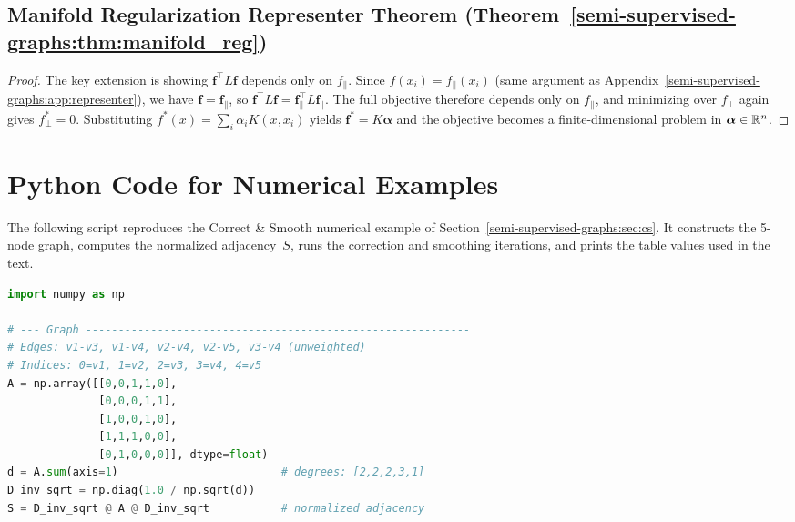 \begin{notechapter}
\subsection{Manifold Regularization Representer Theorem
  (Theorem~\ref{semi-supervised-graphs:thm:manifold_reg})}
\label{semi-supervised-graphs:app:manifold}

\begin{proof}
The key extension is showing $\mathbf{f}^\top L\mathbf{f}$ depends only on
$f_\parallel$. Since $f(x_i) = f_\parallel(x_i)$ (same argument as
Appendix~\ref{semi-supervised-graphs:app:representer}), we have $\mathbf{f} = \mathbf{f}_\parallel$,
so $\mathbf{f}^\top L\mathbf{f} = \mathbf{f}_\parallel^\top L\mathbf{f}_\parallel$.
The full objective therefore depends only on $f_\parallel$, and minimizing over
$f_\perp$ again gives $f_\perp^* = 0$. Substituting
$f^*(x) = \sum_i \alpha_i K(x, x_i)$ yields $\mathbf{f}^* = K\boldsymbol{\alpha}$
and the objective becomes a finite-dimensional problem in
$\boldsymbol{\alpha} \in \mathbb{R}^n$.
\end{proof}


\newpage
\section{Python Code for Numerical Examples}
\label{semi-supervised-graphs:app:code}

The following script reproduces the Correct \& Smooth numerical example of
Section~\ref{semi-supervised-graphs:sec:cs}. It constructs the 5-node graph, computes the normalized
adjacency~$S$, runs the correction and smoothing iterations, and prints the
table values used in the text.


\begin{tcolorbox}[
  title={Listing 1: Correct \& Smooth on the 5-node example (Section~\ref{semi-supervised-graphs:sec:cs})},
  colback=white, colframe=black!70, fonttitle=\small\bfseries,
  breakable, enhanced, left=2mm, right=2mm, top=1mm, bottom=1mm]
\begin{lstlisting}[language=Python, basicstyle=\ttfamily\small]
import numpy as np

# --- Graph -----------------------------------------------------------
# Edges: v1-v3, v1-v4, v2-v4, v2-v5, v3-v4 (unweighted)
# Indices: 0=v1, 1=v2, 2=v3, 3=v4, 4=v5
A = np.array([[0,0,1,1,0],
              [0,0,0,1,1],
              [1,0,0,1,0],
              [1,1,1,0,0],
              [0,1,0,0,0]], dtype=float)
d = A.sum(axis=1)                         # degrees: [2,2,2,3,1]
D_inv_sqrt = np.diag(1.0 / np.sqrt(d))
S = D_inv_sqrt @ A @ D_inv_sqrt           # normalized adjacency


\end{lstlisting}
\end{tcolorbox}
\end{notechapter}
